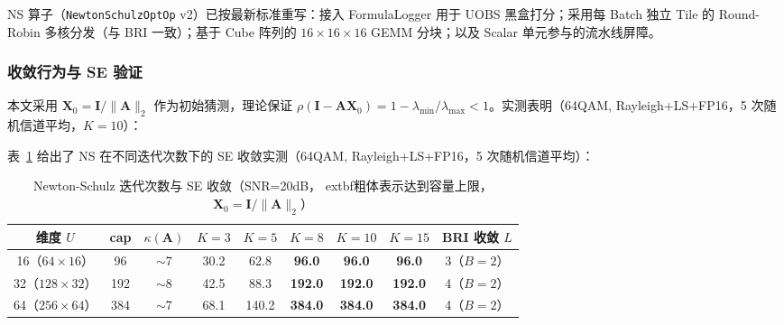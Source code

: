 \documentclass{CjC}
\begin{document}
    NS 算子（\texttt{NewtonSchulzOptOp} v2）已按最新标准重写：接入 FormulaLogger
    用于 UOBS 黑盒打分；采用每 Batch 独立 Tile 的 Round-Robin 多核分发（与 BRI
    一致）；基于 Cube 阵列的 $16\times16\times16$ GEMM 分块；以及 Scalar
    单元参与的流水线屏障。

    \subsubsection{收敛行为与 SE 验证}

    本文采用 $\bm{X}_{0}= \bm{I}/\|\bm{A}\|_{2}$ 作为初始猜测，理论保证
    $\rho(\bm{I}-\bm{A}\bm{X}_{0}) = 1-\lambda_{\min}/\lambda_{\max}< 1$。实测表明（64QAM,
    Rayleigh+LS+FP16，5 次随机信道平均，$K=10$）：

    表~\ref{tab:ns-se-convergence} 给出了 NS 在不同迭代次数下的 SE 收敛实测（64QAM,
    Rayleigh+LS+FP16，5 次随机信道平均）：

    \begin{table}[H]
        \centering
        \caption{Newton-Schulz 迭代次数与 SE 收敛（SNR=20dB， extbf{粗体}表示达到容量上限，$\bm
        {X}_{0}=\bm{I}/\|\bm{A}\|_{2}$）}
        \label{tab:ns-se-convergence}
        \begin{tabular}{c c c c c c c c c}
            \toprule \textbf{维度 $U$}  & \textbf{cap} & \textbf{$\kappa(\bm{A})$} & $K=3$ & $K=5$ & $K=8$          & $K=10$         & $K=15$         & \textbf{BRI 收敛 $L$} \\
            \midrule 16（$64\times16$） & 96           & $\sim$7                   & 30.2  & 62.8  & \textbf{96.0}  & \textbf{96.0}  & \textbf{96.0}  & 3（$B=2$）            \\
            32（$128\times32$）         & 192          & $\sim$8                   & 42.5  & 88.3  & \textbf{192.0} & \textbf{192.0} & \textbf{192.0} & 4（$B=2$）            \\
            64（$256\times64$）         & 384          & $\sim$7                   & 68.1  & 140.2 & \textbf{384.0} & \textbf{384.0} & \textbf{384.0} & 4（$B=2$）            \\
            \bottomrule
        \end{tabular}
    \end{table}
\end{document}
